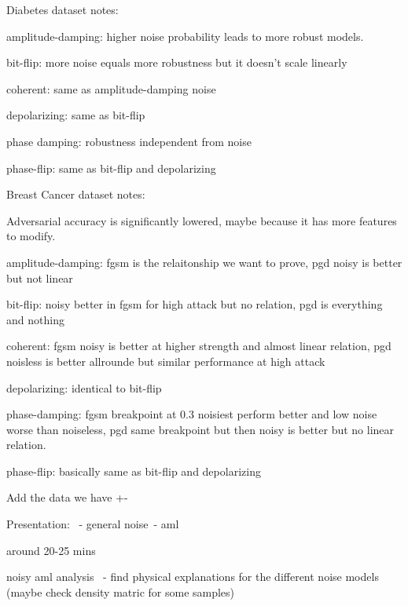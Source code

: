 Diabetes dataset notes: \

amplitude-damping: higher noise probability leads to more robust models. \

bit-flip: more noise equals more robustness but it doesn't scale linearly \

coherent: same as amplitude-damping noise \

depolarizing:  same as bit-flip \

phase damping: robustness independent from noise \

phase-flip: same as bit-flip and depolarizing \

Breast Cancer dataset notes: \

Adversarial accuracy is significantly lowered, maybe because it has
more features to modify. \

amplitude-damping: fgsm is the relaitonship we want to prove, pgd noisy is better but not linear \

bit-flip: noisy better in fgsm for high attack but no relation, pgd is everything and nothing \

coherent: fgsm noisy is better at higher strength and almost linear relation, pgd noisless is better allrounde but similar performance at high attack \

depolarizing: identical to bit-flip

phase-damping: fgsm breakpoint at 0.3 noisiest perform better and low noise worse than noiseless, pgd same breakpoint but then noisy is better but no linear relation. \

phase-flip: basically same as bit-flip and depolarizing \

Add the data we have +- \

Presentation: \
 - general noise\
 - aml \

 around 20-25 mins \

 noisy aml analysis \
 - find physical explanations for the different noise models (maybe check density matric for some samples) \

\fi